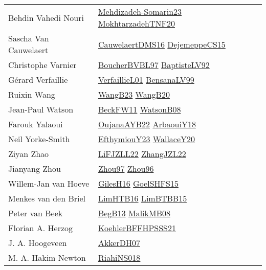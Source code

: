 {\begin{longtable}{p{4cm}p{20cm}}
Behdin Vahedi Nouri & \href{papers/Mehdizadeh-Somarin23.pdf}{Mehdizadeh-Somarin23}\cite{Mehdizadeh-Somarin23} \href{}{MokhtarzadehTNF20}\cite{MokhtarzadehTNF20} \\
Sascha Van Cauwelaert & \href{papers/CauwelaertDMS16.pdf}{CauwelaertDMS16}\cite{CauwelaertDMS16} \href{papers/DejemeppeCS15.pdf}{DejemeppeCS15}\cite{DejemeppeCS15} \\
Christophe Varnier & \href{}{BoucherBVBL97}\cite{BoucherBVBL97} \href{papers/BaptisteLV92.pdf}{BaptisteLV92}\cite{BaptisteLV92} \\
G{\'{e}}rard Verfaillie & \href{papers/VerfaillieL01.pdf}{VerfaillieL01}\cite{VerfaillieL01} \href{articles/BensanaLV99.pdf}{BensanaLV99}\cite{BensanaLV99} \\
Ruixin Wang & \href{papers/WangB23.pdf}{WangB23}\cite{WangB23} \href{papers/WangB20.pdf}{WangB20}\cite{WangB20} \\
Jean{-}Paul Watson & \href{}{BeckFW11}\cite{BeckFW11} \href{papers/WatsonB08.pdf}{WatsonB08}\cite{WatsonB08} \\
Farouk Yalaoui & \href{papers/OujanaAYB22.pdf}{OujanaAYB22}\cite{OujanaAYB22} \href{papers/ArbaouiY18.pdf}{ArbaouiY18}\cite{ArbaouiY18} \\
Neil Yorke{-}Smith & \href{papers/EfthymiouY23.pdf}{EfthymiouY23}\cite{EfthymiouY23} \href{articles/WallaceY20.pdf}{WallaceY20}\cite{WallaceY20} \\
Ziyan Zhao & \href{papers/LiFJZLL22.pdf}{LiFJZLL22}\cite{LiFJZLL22} \href{papers/ZhangJZL22.pdf}{ZhangJZL22}\cite{ZhangJZL22} \\
Jianyang Zhou & \href{articles/Zhou97.pdf}{Zhou97}\cite{Zhou97} \href{papers/Zhou96.pdf}{Zhou96}\cite{Zhou96} \\
Willem{-}Jan van Hoeve & \href{papers/GilesH16.pdf}{GilesH16}\cite{GilesH16} \href{articles/GoelSHFS15.pdf}{GoelSHFS15}\cite{GoelSHFS15} \\
Menkes van den Briel & \href{papers/LimHTB16.pdf}{LimHTB16}\cite{LimHTB16} \href{papers/LimBTBB15.pdf}{LimBTBB15}\cite{LimBTBB15} \\
Peter van Beek & \href{}{BegB13}\cite{BegB13} \href{}{MalikMB08}\cite{MalikMB08} \\
Florian A. Herzog & \href{articles/KoehlerBFFHPSSS21.pdf}{KoehlerBFFHPSSS21}\cite{KoehlerBFFHPSSS21} \\
J. A. Hoogeveen & \href{papers/AkkerDH07.pdf}{AkkerDH07}\cite{AkkerDH07} \\
M. A. Hakim Newton & \href{papers/RiahiNS018.pdf}{RiahiNS018}\cite{RiahiNS018} \\

\end{longtable}}
